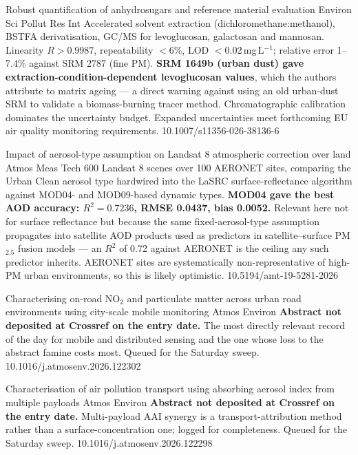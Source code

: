 \documentclass[10pt]{article}
\begin{document}
{Robust quantification of anhydrosugars and reference material evaluation}
{Environ Sci Pollut Res Int}
{Accelerated solvent extraction (dichloromethane:methanol), BSTFA derivatisation, GC/MS
for levoglucosan, galactosan and mannosan. Linearity $R>0.9987$, repeatability $<$6\%,
LOD $<$0.02\,mg\,L$^{-1}$; relative error 1--7.4\% against SRM 2787 (fine PM).
\textbf{SRM 1649b (urban dust) gave extraction-condition-dependent levoglucosan values},
which the authors attribute to matrix ageing --- a direct warning against using an old
urban-dust SRM to validate a biomass-burning tracer method. Chromatographic calibration
dominates the uncertainty budget. Expanded uncertainties meet forthcoming EU air quality
monitoring requirements.}
{10.1007/s11356-026-38136-6}

{Impact of aerosol-type assumption on Landsat 8 atmospheric correction over land}
{Atmos Meas Tech}
{600 Landsat 8 scenes over 100 AERONET sites, comparing the Urban Clean aerosol type
hardwired into the LaSRC surface-reflectance algorithm against MOD04- and MOD09-based
dynamic types. \textbf{MOD04 gave the best AOD accuracy: $R^2=0.7236$, RMSE 0.0437, bias
0.0052.} Relevant here not for surface reflectance but because the same fixed-aerosol-type
assumption propagates into satellite AOD products used as predictors in
satellite--surface PM$_{2.5}$ fusion models --- an $R^2$ of 0.72 against AERONET is the
ceiling any such predictor inherits. AERONET sites are systematically non-representative
of high-PM urban environments, so this is likely optimistic.}
{10.5194/amt-19-5281-2026}

{Characterising on-road NO$_2$ and particulate matter across urban road environments
using city-scale mobile monitoring}
{Atmos Environ}
{\textbf{Abstract not deposited at Crossref on the entry date.} The most directly
relevant record of the day for mobile and distributed sensing and the one whose loss to
the abstract famine costs most. Queued for the Saturday sweep.}
{10.1016/j.atmosenv.2026.122302}

{Characterisation of air pollution transport using absorbing aerosol index from multiple
payloads}
{Atmos Environ}
{\textbf{Abstract not deposited at Crossref on the entry date.} Multi-payload AAI
synergy is a transport-attribution method rather than a surface-concentration one;
logged for completeness. Queued for the Saturday sweep.}
{10.1016/j.atmosenv.2026.122298}
\end{document}
